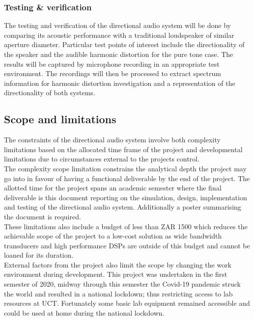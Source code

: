 \subsubsection{Testing \& verification}
The testing and verification of the directional audio system will be done by comparing its acoustic performance with a traditional loudspeaker of similar aperture diameter. Particular test points of interest include the directionality of the speaker and the audible harmonic distortion for the pure tone case. The results will be captured by microphone recording in an appropriate test environment. The recordings will then be processed to extract spectrum information for harmonic distortion investigation and a representation of the directionality of both systems.

\subsection{Scope and limitations}
The constraints of the directional audio system involve both complexity limitations based on the allocated time frame of the project and developmental limitations due to circumstances external to the projects control.\\
The complexity scope limitation constrains the analytical depth the project may go into in favour of having a functional deliverable by the end of the project. The allotted time for the project spans an academic semester where the final deliverable is this document reporting on the simulation, design, implementation and testing of the directional audio system. Additionally a poster summarising the document is required.\\
These limitations also include a budget of less than ZAR 1500 which reduces the achievable scope of the project to a low-cost solution as wide bandwidth transducers and high performance DSPs are outside of this budget and cannot be loaned for its duration.\\
External factors from the project also limit the scope by changing the work environment during development. This project was undertaken in the first semester of 2020, midway through this semester the Covid-19 pandemic struck the world and resulted in a national lockdown; thus restricting access to lab resources at UCT. Fortunately some basic lab equipment remained accessible and could be used at home during the national lockdown.
\newpage
